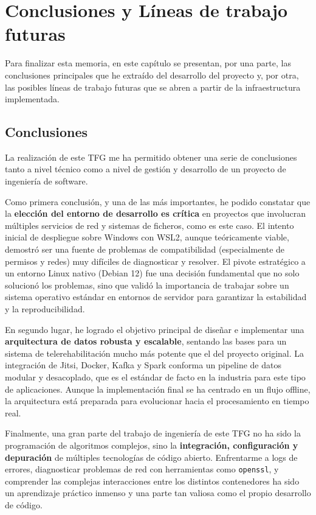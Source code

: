 \chapter{Conclusiones y Líneas de trabajo futuras}
\label{chap:conclusiones}

Para finalizar esta memoria, en este capítulo se presentan, por una parte, las conclusiones principales que he extraído del desarrollo del proyecto y, por otra, las posibles líneas de trabajo futuras que se abren a partir de la infraestructura implementada.

\section{Conclusiones}

La realización de este TFG me ha permitido obtener una serie de conclusiones tanto a nivel técnico como a nivel de gestión y desarrollo de un proyecto de ingeniería de software.

Como primera conclusión, y una de las más importantes, he podido constatar que la \textbf{elección del entorno de desarrollo es crítica} en proyectos que involucran múltiples servicios de red y sistemas de ficheros, como es este caso. El intento inicial de despliegue sobre Windows con WSL2, aunque teóricamente viable, demostró ser una fuente de problemas de compatibilidad (especialmente de permisos y redes) muy difíciles de diagnosticar y resolver. El pivote estratégico a un entorno Linux nativo (Debian 12) fue una decisión fundamental que no solo solucionó los problemas, sino que validó la importancia de trabajar sobre un sistema operativo estándar en entornos de servidor para garantizar la estabilidad y la reproducibilidad.

En segundo lugar, he logrado el objetivo principal de diseñar e implementar una \textbf{arquitectura de datos robusta y escalable}, sentando las bases para un sistema de telerehabilitación mucho más potente que el del proyecto original. La integración de Jitsi, Docker, Kafka y Spark conforma un pipeline de datos modular y desacoplado, que es el estándar de facto en la industria para este tipo de aplicaciones. Aunque la implementación final se ha centrado en un flujo offline, la arquitectura está preparada para evolucionar hacia el procesamiento en tiempo real.

Finalmente, una gran parte del trabajo de ingeniería de este TFG no ha sido la programación de algoritmos complejos, sino la \textbf{integración, configuración y depuración} de múltiples tecnologías de código abierto. Enfrentarme a logs de errores, diagnosticar problemas de red con herramientas como \texttt{openssl}, y comprender las complejas interacciones entre los distintos contenedores ha sido un aprendizaje práctico inmenso y una parte tan valiosa como el propio desarrollo de código.

